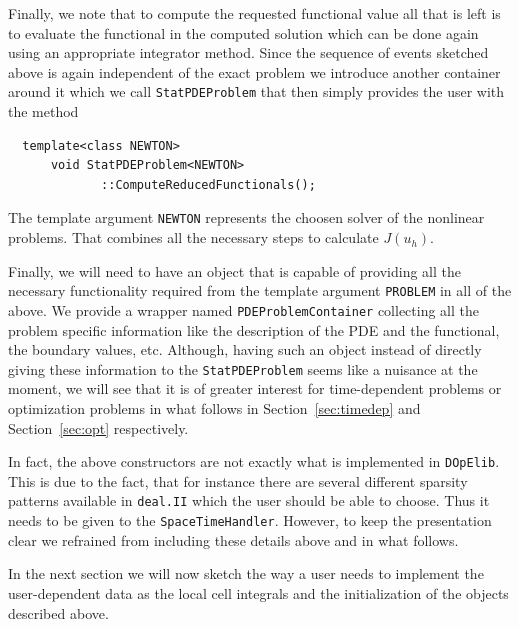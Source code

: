 \documentclass[smallextended]{svjour3}       %
\numberwithin{equation}{section}
\newcommand{\deal}{\texttt{deal.II}}
\newcommand{\dope}{\texttt{DOpElib}}
\begin{document}
Finally, we note that to compute the requested functional value 
all that is left is to evaluate the functional in the computed solution 
which can be done again using an appropriate integrator method.
Since the sequence of events sketched above is again independent of the 
exact problem we introduce another container around it which we call 
\texttt{StatPDEProblem} that then simply provides the user with the 
method
\begin{lstlisting}
  template<class NEWTON>
      void StatPDEProblem<NEWTON>
             ::ComputeReducedFunctionals();
\end{lstlisting}
The template argument \texttt{NEWTON} represents the choosen solver of the nonlinear problems.
That combines all the necessary steps to calculate $J(u_h)$. 

Finally, we will need to have an object that is capable of providing all 
the necessary functionality required from the template argument 
\texttt{PROBLEM} in all of the above. We provide a wrapper named
\texttt{PDEProblemContainer} collecting all the problem specific information 
like the description of the PDE and the functional, the boundary values, etc. 
Although, having such an object instead of directly giving these information
to the \texttt{StatPDEProblem} seems like a nuisance at the moment, we will 
see that it is of greater interest for time-dependent problems or 
optimization problems in what follows in Section~\ref{sec:timedep} and
Section~\ref{sec:opt} respectively. 

\begin{remark}
In fact, the above constructors are not exactly what is implemented in \dope{}.
This is due to the fact, that for instance 
there are several different sparsity patterns available in 
\deal{} which the user should be able to choose. Thus it needs to be 
given to the \texttt{SpaceTimeHandler}. However, to keep the 
presentation clear we refrained from including these details above and in
what follows.
\end{remark} 

In the next section we will now sketch the way a user needs to implement the
user-dependent data as the local cell integrals and the initialization of the
objects described above.
\end{document}

